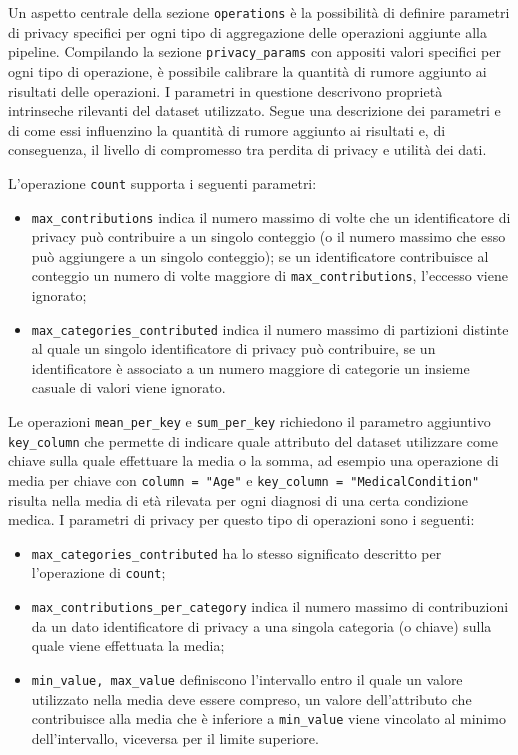 Un aspetto centrale della sezione \texttt{operations} è la possibilità di definire parametri di privacy specifici per ogni tipo di aggregazione delle operazioni aggiunte alla pipeline. Compilando la sezione \texttt{privacy\_params} con appositi valori specifici per ogni tipo di operazione, è possibile calibrare la quantità di rumore aggiunto ai risultati delle operazioni. I parametri in questione descrivono proprietà intrinseche rilevanti del dataset utilizzato. Segue una descrizione dei parametri e di come essi influenzino la quantità di rumore aggiunto ai risultati e, di conseguenza, il livello di compromesso tra perdita di privacy e utilità dei dati.

\noindent
L'operazione \texttt{count} supporta i seguenti parametri:
\begin{itemize}
    \item \texttt{max\_contributions} indica il numero massimo di volte che un identificatore di privacy può contribuire a un singolo conteggio (o il numero massimo che esso può aggiungere a un singolo conteggio); se un identificatore contribuisce al conteggio un numero di volte maggiore di \texttt{max\_contributions}, l'eccesso viene ignorato;
    \item \texttt{max\_categories\_contributed} indica il numero massimo di partizioni distinte al quale un singolo identificatore di privacy può contribuire, se un identificatore è associato a un numero maggiore di categorie un insieme casuale di valori viene ignorato.
\end{itemize}

\noindent
Le operazioni \texttt{mean\_per\_key} e \texttt{sum\_per\_key} richiedono il parametro aggiuntivo \texttt{key\_column} che permette di indicare quale attributo del dataset utilizzare come chiave sulla quale effettuare la media o la somma, ad esempio una operazione di media per chiave con \texttt{column = "Age"} e \texttt{key\_column = "MedicalCondition"} risulta nella media di età rilevata per ogni diagnosi di una certa condizione medica. I parametri di privacy per questo tipo di operazioni sono i seguenti:
\begin{itemize}
    \item \texttt{max\_categories\_contributed} ha lo stesso significato descritto per l'operazione di \texttt{count};
    \item \texttt{max\_contributions\_per\_category} indica il numero massimo di contribuzioni da un dato identificatore di privacy a una singola categoria (o chiave) sulla quale viene effettuata la media;
    \item \texttt{min\_value, max\_value} definiscono l'intervallo entro il quale un valore utilizzato nella media deve essere compreso, un valore dell'attributo che contribuisce alla media che è inferiore a \texttt{min\_value} viene vincolato al minimo dell'intervallo, viceversa per il limite superiore. 
\end{itemize}


